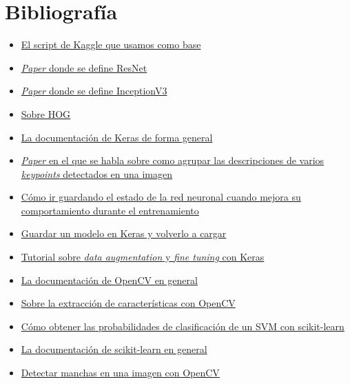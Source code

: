 \section{Bibliografía}
\begin{itemize}
\item \href{https://www.kaggle.com/marek3000/test-num-001}{El script de Kaggle que usamos como base}
\item \href{https://arxiv.org/pdf/1512.03385.pdf}{\textit{Paper} donde se define ResNet}
\item \href{https://arxiv.org/pdf/1409.4842.pdf}{\textit{Paper} donde se define InceptionV3}
\item \href{https://en.wikipedia.org/wiki/Histogram_of_oriented_gradients}{Sobre HOG}
\item \href{https://keras.io/}{La documentación de Keras de forma general}
\item \href{https://www.cs.cmu.edu/~efros/courses/AP06/Papers/csurka-eccv-04.pdf}{\textit{Paper} en el que se habla sobre como agrupar las descripciones de varios \textit{keypoints} detectados en una imagen}
\item \href{http://machinelearningmastery.com/check-point-deep-learning-models-keras/}{Cómo ir guardando el estado de la red neuronal cuando mejora su comportamiento durante el entrenamiento}
\item \href{http://machinelearningmastery.com/save-load-keras-deep-learning-models/}{Guardar un modelo en Keras y volverlo a cargar}
\item \href{https://blog.keras.io/building-powerful-image-classification-models-using-very-little-data.html}{Tutorial sobre \textit{data augmentation} y \textit{fine tuning} con Keras}
\item \href{http://docs.opencv.org/2.4/index.html}{La documentación de OpenCV en general}
\item \href{http://answers.opencv.org/question/61954/extracting-features-with-opencv-for-image-classification/}{Sobre la extracción de características con OpenCV}
\item \href{https://stackoverflow.com/questions/15015710/how-can-i-know-probability-of-class-predicted-by-predict-function-in-support-v}{Cómo obtener las probabilidades de clasificación de un SVM con scikit-learn}
\item \href{http://scikit-learn.org/stable/documentation.html}{La documentación de scikit-learn en general}
\item \href{https://www.learnopencv.com/blob-detection-using-opencv-python-c/}{Detectar manchas en una imagen con OpenCV}

\end{itemize}
